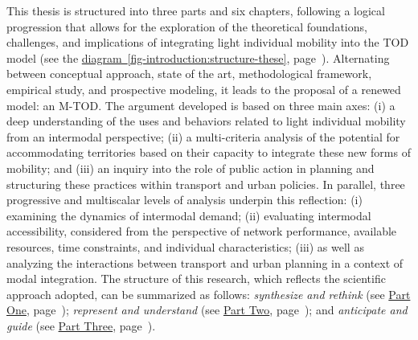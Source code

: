 \begin{refsegment}
This thesis is structured into three parts and six chapters, following a logical progression that allows for the exploration of the theoretical foundations, challenges, and implications of integrating light individual mobility into the \acrshort{TOD} model (see the \hyperref[fig-introduction:structure-these]{diagram~\ref{fig-introduction:structure-these}}, page~\pageref{fig-introduction:structure-these}). Alternating between conceptual approach, state of the art, methodological framework, empirical study, and prospective modeling, it leads to the proposal of a renewed model: an \acrfull{M-TOD}. The argument developed is based on three main axes: (i) a deep understanding of the uses and behaviors related to light individual mobility from an intermodal perspective; (ii) a multi-criteria analysis of the potential for accommodating territories based on their capacity to integrate these new forms of mobility; and (iii) an inquiry into the role of public action in planning and structuring these practices within transport and urban policies. In parallel, three progressive and multiscalar levels of analysis underpin this reflection: (i) examining the dynamics of intermodal demand; (ii) evaluating intermodal accessibility, considered from the perspective of network performance, available resources, time constraints, and individual characteristics; (iii) as well as analyzing the interactions between transport and urban planning in a context of modal integration. The structure of this research, which reflects the scientific approach adopted, can be summarized as follows: \textsl{synthesize and rethink} (see \hyperref[part1:titre]{Part One}, page~\pageref{part1:titre}); \textsl{represent and understand} (see \hyperref[part2:titre]{Part Two}, page~\pageref{part2:titre}); and \textsl{anticipate and guide} (see \hyperref[part3:titre]{Part Three}, page~\pageref{part3:titre}).%


\end{refsegment}
